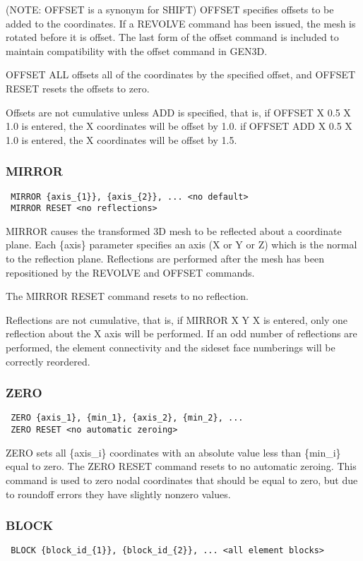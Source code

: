 (NOTE: OFFSET is a synonym for SHIFT)
OFFSET specifies offsets to be added to the coordinates.  If a REVOLVE
command has been issued, the mesh is rotated before it is offset.  The
last form of the offset command is included to maintain compatibility
with the offset command in GEN3D.

OFFSET ALL offsets all of the coordinates by the specified offset, and
OFFSET RESET resets the offsets to zero.

Offsets are not cumulative unless ADD is specified, that is, 
if OFFSET X 0.5 X 1.0 is entered, the X coordinates will be offset by 1.0.
if OFFSET ADD X 0.5 X 1.0 is entered, the X coordinates will be offset by 1.5.
\subsubsection{MIRROR}
\begin{verbatim}
 MIRROR {axis_{1}}, {axis_{2}}, ... <no default> 
 MIRROR RESET <no reflections>
\end{verbatim}

MIRROR causes the transformed 3D mesh to be reflected about a coordinate
plane.  Each \{axis\} parameter specifies an axis (X or Y or Z) which is
the normal to the reflection plane.  Reflections are performed after the
mesh has been repositioned by the REVOLVE and OFFSET commands.

The MIRROR RESET command resets to no reflection.

Reflections are not cumulative, that is, if MIRROR X Y X is entered,
only one reflection about the X axis will be performed.  If an odd
number of reflections are performed, the element connectivity and the
sideset face numberings will be correctly reordered.
\subsubsection{ZERO}
\begin{verbatim}
 ZERO {axis_1}, {min_1}, {axis_2}, {min_2}, ... 
 ZERO RESET <no automatic zeroing>
\end{verbatim}

ZERO sets all \{axis\_i\} coordinates with an absolute value less than
\{min\_i\} equal to zero.  The ZERO RESET command resets to no automatic
zeroing.  This command is used to zero nodal coordinates that should be
equal to zero, but due to roundoff errors they have slightly nonzero
values.
\subsubsection{BLOCK}
\begin{verbatim}
 BLOCK {block_id_{1}}, {block_id_{2}}, ... <all element blocks>
\end{verbatim}

